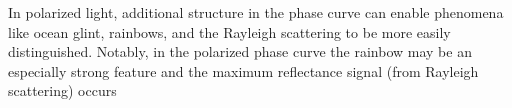 \documentclass[
    usenatbib,
]{mnras}
\begin{document}
 In polarized light, additional structure in the phase curve can enable phenomena like ocean glint, rainbows, and the Rayleigh scattering to be more easily distinguished.  Notably, in the polarized phase curve the rainbow may be an especially strong feature and the maximum reflectance signal (from Rayleigh scattering) occurs 

 






\end{document}
